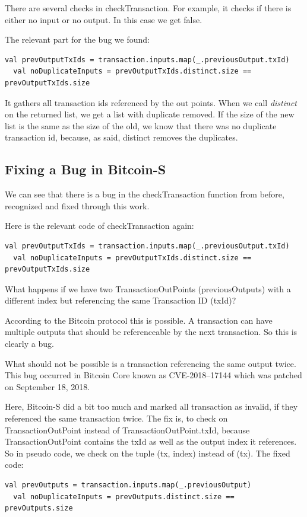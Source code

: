\documentclass[runningheads]{llncs}
\begin{document}
There are several checks in checkTransaction.
For example, it checks if there is either no input or no output.
In this case we get false.

The relevant part for the bug we found:
\begin{lstlisting}[style=scala]
  val prevOutputTxIds = transaction.inputs.map(_.previousOutput.txId)
  val noDuplicateInputs = prevOutputTxIds.distinct.size == prevOutputTxIds.size
\end{lstlisting}

It gathers all transaction ids referenced by the out points.  When we
call \emph{distinct} on the returned list, we get a list with
duplicate removed.  If the size of the new list is the same as the
size of the old, we know that there was no duplicate transaction id,
because, as said, distinct removes the duplicates.


\subsection{Fixing a Bug in Bitcoin-S}
\label{sec:bugfix}

We can see that there is a bug in the checkTransaction function from
before, recognized and fixed through this work.

Here is the relevant code of checkTransaction again:
\begin{lstlisting}[style=scala]
  val prevOutputTxIds = transaction.inputs.map(_.previousOutput.txId)
  val noDuplicateInputs = prevOutputTxIds.distinct.size == prevOutputTxIds.size
\end{lstlisting}

What happens if we have two TransactionOutPoints (previousOutputs) with a different index but referencing the same Transaction ID (txId)?

According to the Bitcoin protocol this is possible.  A transaction can
have multiple outputs that should be referenceable by the next
transaction.  So this is clearly a bug.

What should not be possible is a transaction referencing the same
output twice.  This bug occurred in Bitcoin Core known as
CVE-2018–17144 which was patched on September 18,
2018. \cite{cve201817144}

Here, Bitcoin-S did a bit too much and marked all transaction as
invalid, if they referenced the same transaction twice.  The fix is,
to check on TransactionOutPoint instead of TransactionOutPoint.txId,
because TransactionOutPoint contains the txId as well as the output
index it references.  So in pseudo code, we check on the tuple (tx,
index) instead of (tx).  The fixed code:
\begin{lstlisting}[style=scala]
  val prevOutputs = transaction.inputs.map(_.previousOutput)
  val noDuplicateInputs = prevOutputs.distinct.size == prevOutputs.size
\end{lstlisting}
\end{document}
